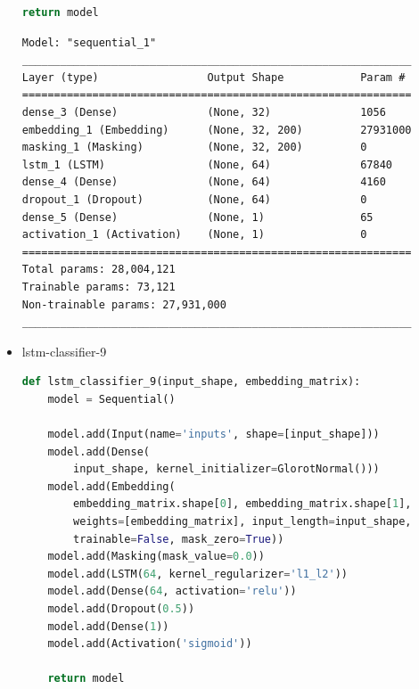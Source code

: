 \documentclass{article}
\begin{document}
\begin{itemize}
\begin{lstlisting}[language=Python, caption=Дефиниция на lstm-classifier-8.]
    return model
\end{lstlisting}

\begin{lstlisting}[numbers=none, caption=Обобщение на lstm-classifier-8.]
Model: "sequential_1"
_____________________________________________________________
Layer (type)                 Output Shape            Param #
=============================================================
dense_3 (Dense)              (None, 32)              1056
embedding_1 (Embedding)      (None, 32, 200)         27931000
masking_1 (Masking)          (None, 32, 200)         0
lstm_1 (LSTM)                (None, 64)              67840
dense_4 (Dense)              (None, 64)              4160
dropout_1 (Dropout)          (None, 64)              0
dense_5 (Dense)              (None, 1)               65
activation_1 (Activation)    (None, 1)               0
=============================================================
Total params: 28,004,121
Trainable params: 73,121
Non-trainable params: 27,931,000
_____________________________________________________________
\end{lstlisting}

  \item lstm-classifier-9

\begin{lstlisting}[language=Python, caption=Дефиниция на lstm-classifier-9.]
def lstm_classifier_9(input_shape, embedding_matrix):
    model = Sequential()

    model.add(Input(name='inputs', shape=[input_shape]))
    model.add(Dense(
        input_shape, kernel_initializer=GlorotNormal()))
    model.add(Embedding(
        embedding_matrix.shape[0], embedding_matrix.shape[1],
        weights=[embedding_matrix], input_length=input_shape,
        trainable=False, mask_zero=True))
    model.add(Masking(mask_value=0.0))
    model.add(LSTM(64, kernel_regularizer='l1_l2'))
    model.add(Dense(64, activation='relu'))
    model.add(Dropout(0.5))
    model.add(Dense(1))
    model.add(Activation('sigmoid'))

    return model
\end{lstlisting}


\end{itemize}
\end{document}
